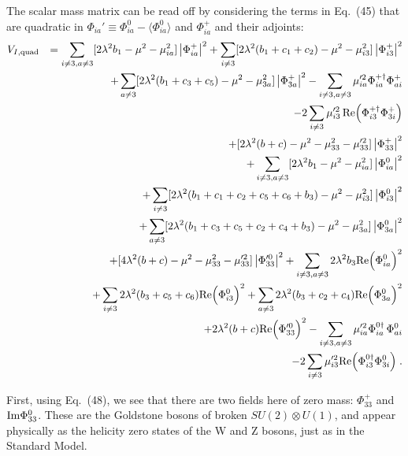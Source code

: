 The scalar mass matrix can be read off by considering the terms in Eq.~(45) that are quadratic in $\Phi_{ia}'\equiv \Phi_{ia}^0-\langle \Phi_{ia}^0\rangle$ and  $\Phi^+_{ia}$ and their adjoints:
\begin{eqnarray}
V_{I, {\rm quad}}&&=\sum_{i\neq 3, a\neq 3} [2\lambda^2 b_1-\mu^2-\mu^2_{ia}]\left|\Phi_{ia}^+\right|^2
+\sum_{i\neq 3}[2\lambda^2(b_1+c_1+c_2)-\mu^2-\mu_{i3}^2] \left|\Phi_{i3}^+\right|^2\nonumber\\&&+  \sum_{a\neq 3} [2\lambda^2(b_1+c_3+c_5)-\mu^2-\mu_{3a}^2]\left|\Phi_{3a}^+\right|^2-\sum_{i\neq 3, a\neq 3}\mu'^2_{ia}\Phi^{+\dagger}_{ia} \Phi^+_{ai} \nonumber\\&&
-2\sum_{i\neq 3}\mu'^2_{i3}\,{\rm Re}\Big(\Phi^{+\dagger}_{i3} \Phi^+_{3i}\Big)
\nonumber\\&& +[2\lambda^2(b+c)-\mu^2-\mu^2_{33}-\mu'^2_{33}]\left|\Phi_{33}^+\right|^2\nonumber\\
&&+\sum_{i\neq 3, a\neq 3} [2\lambda^2 b_1-\mu^2-\mu^2_{ia}]\left|\Phi_{ia}^0\right|^2\nonumber\\&&+\sum_{i\neq 3}[2\lambda^2(b_1+c_1+c_2+c_5+c_6+b_3)-\mu^2-\mu_{i3}^2] \left|\Phi_{i3}^0\right|^2\nonumber\\&&
+\sum_{a\neq 3}[2\lambda^2(b_1+c_3+c_5+c_2+c_4+b_3)-\mu^2-\mu_{3a}^2] \left|\Phi^0_{3a}\right|^2\nonumber\\&&
+[4\lambda^2(b+c)-\mu^2-\mu^2_{33}-\mu'^2_{33}]\left|\Phi'^0_{33}\right|^2+\sum_{i\neq 3, a\neq 3}2\lambda^2 b_3{\rm Re}\Big(\Phi_{ia}^0\Big)^2\nonumber\\&&
+\sum_{i\neq 3}2\lambda^2 (b_3+c_5+c_6){\rm Re}\Big(\Phi_{i3}^0\Big)^2+\sum_{a\neq 3}2\lambda^2 (b_3+c_2+c_4){\rm Re}\Big(\Phi_{3a}^0\Big)^2
\nonumber\\&&+2\lambda^2(b+c){\rm Re}\Big(\Phi'^0_{33}\Big)^2-\sum_{i\neq 3, a\neq 3}\mu'^2_{ia}\Phi_{ia}^{0\dagger}\,\Phi_{ai}^0\nonumber\\&&
-2\sum_{i\neq 3}\mu'^2_{i3}{\rm Re}\Big(\Phi_{i3}^{0\dagger}\Phi^0_{3i}\Big)
\;.
\end{eqnarray}





First, using Eq.~(48), we see that there are two fields here of zero mass: $\Phi_{33}^+$ and ${\rm Im}\Phi^0_{33}$.  These are the Goldstone bosons of broken $SU(2)\otimes U(1)$, and appear physically as the helicity zero states of the W and Z bosons, just as in the Standard Model.



